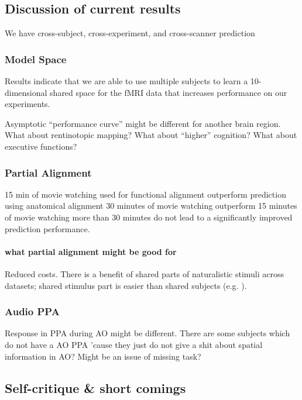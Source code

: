 \subsection{Discussion of current results}


We have cross-subject, cross-experiment, and cross-scanner prediction


\subsubsection{Model Space}
%
Results indicate that we are able to use multiple subjects to learn a
10-dimensional shared space for the fMRI data that increases performance on our
experiments.

%
Asymptotic ``performance curve'' might be different for another brain region.
%
What about rentinotopic mapping?
%
What about ``higher'' cognition?
%
What about executive functions?


\subsubsection{Partial Alignment}
%
15 min of movie watching used for functional alignment outperform prediction
using anatomical alignment
%
30 minutes of movie watching outperform 15 minutes of movie watching
%
more than 30 minutes do not lead to a significantly improved prediction
performance.


\paragraph{what partial alignment might be good for}
%
Reduced costs.
%
There is a benefit of shared parts of naturalistic stimuli across datasets;
shared stimulus part is easier than shared subjects (e.g.
\citep{zhang2018transfer}).


\subsubsection{Audio PPA}

%
Response in PPA during AO might be different.
%
There are some subjects which do not have a AO PPA 'cause they just do not give
a shit about spatial information in AO? Might be an issue of missing task?


\subsection{Self-critique \& short comings}


